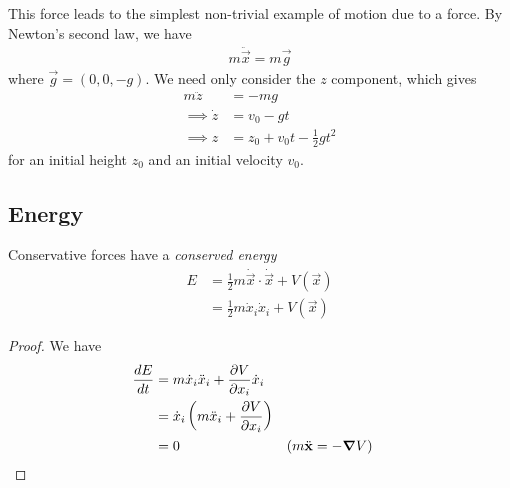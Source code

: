 \documentclass{../template/note}
\begin{document}
    This force leads to the simplest non-trivial example of motion due to a force. By Newton's second law, we have
    \begin{align*}
        m \ddot{\vec x} = m \vec g
    \end{align*}
    where \(\vec g = (0, 0, -g)\). We need only consider the \(z\) component, which gives
    \begin{align*}
        m \ddot z &= -mg \\
        \implies \dot z &= v_0 - gt \\
        \implies z &= z_0 + v_0t - \frac{1}{2}gt^2
    \end{align*}
    for an initial height \(z_0\) and an initial velocity \(v_0\).

    \subsection{Energy}

    \begin{proposition}
        Conservative forces have a \emph{conserved energy}
        \begin{align*}
            E &= \frac{1}{2} m \dot{\vec x} \cdot \dot{\vec x} + V(\vec x) \\
            &= \frac{1}{2} m \dot x_i \dot x_i + V(\vec x)
        \end{align*}
    \end{proposition}
    
    \begin{proof}
        We have
        \begin{align*}
            \frac{dE}{dt} &= m \dot x_i\ddot x_i + \pd{V}{x_i} \dot x_i \\
            &= \dot x_i \left(m \ddot x_i + \pd{V}{x_i}\right) \\
            &= 0 && (m \ddot{\vec x} = -\grad V)
        \end{align*}
    \end{proof}
    
\end{document}
